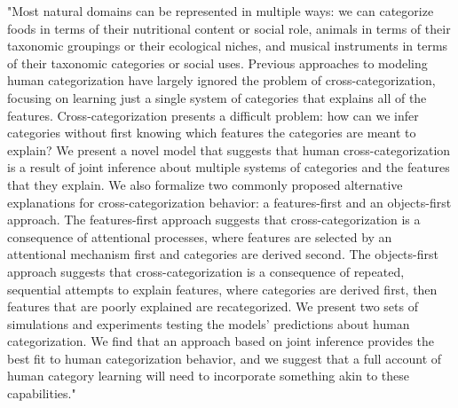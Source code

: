 "Most natural domains can be represented in multiple ways: we can categorize foods in terms of their nutritional content or social role, animals in terms of their taxonomic groupings or their ecological niches, and musical instruments in terms of their taxonomic categories or social uses. Previous approaches to modeling human categorization have largely ignored the problem of cross-categorization, focusing on learning just a single system of categories that explains all of the features. Cross-categorization presents a difficult problem: how can we infer categories without first knowing which features the categories are meant to explain? We present a novel model that suggests that human cross-categorization is a result of joint inference about multiple systems of categories and the features that they explain. We also formalize two commonly proposed alternative explanations for cross-categorization behavior: a features-first and an objects-first approach. The features-first approach suggests that cross-categorization is a consequence of attentional processes, where features are selected by an attentional mechanism first and categories are derived second. The objects-first approach suggests that cross-categorization is a consequence of repeated, sequential attempts to explain features, where categories are derived first, then features that are poorly explained are recategorized. We present two sets of simulations and experiments testing the models' predictions about human categorization. We find that an approach based on joint inference provides the best fit to human categorization behavior, and we suggest that a full account of human category learning will need to incorporate something akin to these capabilities."

\cite{article-A probabilistic model of cross-categorization}
